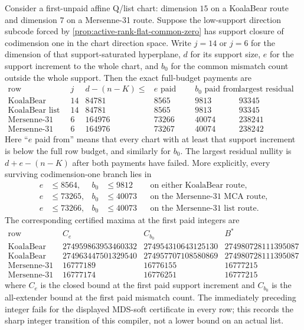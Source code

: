 \documentclass[11pt,a4paper]{amsart}
\numberwithin{equation}{section}
\theoremstyle{remark}
\begin{document}
\begin{proposition}
\label{prop:active-codim-one}
Consider a first-unpaid affine Q/list chart: dimension \(15\) on a
KoalaBear route and dimension \(7\) on a Mersenne-31 route.  Suppose the
low-support direction subcode forced by
\cref{prop:active-rank-flat-common-zero} has support closure of codimension
one in the chart direction space.  Write \(j=14\) or \(j=6\) for the
dimension of that support-saturated hyperplane, \(d\) for its support
size, \(e\) for the support increment to the whole chart, and \(b_0\) for
the common mismatch count outside the whole support.  Then the exact
full-budget payments are
\[
\begin{array}{c|r|r|r|r|r}
\text{row}&j&d-(n-K)\le&e\text{ paid from}&b_0\text{ paid from}
 &\text{largest residual nullity}\\ \hline
\text{KoalaBear MCA}&14&84781&8565&9813&93345\\
\text{KoalaBear list}&14&84781&8565&9813&93345\\
\text{Mersenne-31 MCA}&6&164976&73266&40074&238241\\
\text{Mersenne-31 list}&6&164976&73267&40074&238242
\end{array}
\tag{CR-active}\label{eq:active-codim-one-ranges}
\]
Here ``\(e\) paid from'' means that every chart with at least that support
increment is below the full row budget, and similarly for \(b_0\).  The
largest residual nullity is \(d+e-(n-K)\) after both payments have failed.
More explicitly, every surviving codimension-one branch lies in
\begin{align}
 e&\le8564, & b_0&\le9812
 &&\text{on either KoalaBear route},
 \tag{CR-KB}\label{eq:active-codim-one-kb}\\
 e&\le73265, & b_0&\le40073
 &&\text{on the Mersenne-31 MCA route},
 \tag{CR-MCA}\label{eq:active-codim-one-mca}\\
 e&\le73266, & b_0&\le40073
 &&\text{on the Mersenne-31 list route}.
 \tag{CR-list}\label{eq:active-codim-one-list}
\end{align}
The corresponding certified maxima at the first paid integers are
\begingroup\scriptsize
\[
\begin{array}{c|r|r|r}
\text{row}&C_e&C_{b_0}&B^*\\ \hline
\text{KoalaBear MCA}&274959863953460332&274954310643125130&274980728111395087\\
\text{KoalaBear list}&274963447501329540&274957707108580869&274980728111395087\\
\text{Mersenne-31 MCA}&16777189&16776155&16777215\\
\text{Mersenne-31 list}&16777174&16776251&16777215
\end{array}
\tag{CR-budget}\label{eq:active-codim-one-budgets}
\]
\endgroup
where $C_e$ is the closed bound at the first paid support increment and
$C_{b_0}$ is the all-extender bound at the first paid mismatch count.
The immediately preceding integer fails for the displayed MDS-soft
certificate in every row; this records the sharp integer transition of
this compiler, not a lower bound on an actual list.
\end{proposition}
\end{document}
